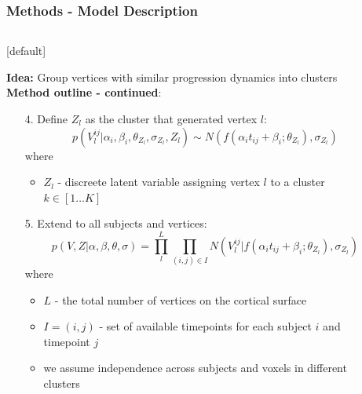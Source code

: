 \documentclass[8pt,xcolor=table]{beamer}
\begin{document}
\begin{frame}
\frametitle{Methods - Model Description}

\begin{columns}[T]
    \begin{column}{.75\textwidth} %
   
    [default]
     
    \textbf{Idea:} Group vertices with similar progression dynamics into clusters\\ 
   \vspace{2em}
    \textbf{Method outline - continued}:
   \begin{enumerate}      
      
      \item[4.] Define $Z_l$ as the cluster that generated vertex $l$:
      $$ p(V_l^{ij} | \alpha_i, \beta_i, \theta_{Z_l}, \sigma_{Z_l}, Z_l) \sim N(f(\alpha_i t_{ij} + \beta_i ; \theta_{Z_l}), \sigma_{Z_l}) $$
        where
	\begin{itemize}
	\item $Z_l$ - discreete latent variable assigning vertex $l$ to a cluster $k \in [1 \dots K]$
	\end{itemize}
      \vspace{1em}
      \item[5.] Extend to all subjects and vertices:
  $$  p(V, Z | \alpha, \beta, \theta, \sigma) = \prod_l^L \prod_{(i,j) \in I} N(V_l^{ij} | f(\alpha_i t_{ij} + \beta_i ; \theta_{Z_l}), \sigma_{Z_l}) $$
  where
  \begin{itemize}
  \item $L$ - the total number of vertices on the cortical surface
  \item $I = {(i,j)}$ - set of available timepoints for each subject $i$ and timepoint $j$   
  \item we assume independence across subjects and voxels in different clusters
  \end{itemize}
     
     \end{enumerate}
     

    \end{column}
    \hspace{-3em}
    \begin{column}{.25\textwidth}


\end{column}
\end{columns}
\end{frame}
\end{document}
